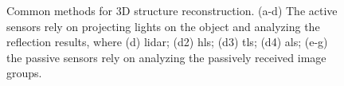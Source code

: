 \begin{figure}[htb!]
  \begin{center}
  \end{center}
  \caption[Common methods for 3D structure reconstruction]{
    Common methods for 3D structure reconstruction. (a-d) The active sensors rely on projecting lights on the object and analyzing the reflection results, where (d) \acrfull{lidar}; (d2) \acrfull{hls}; (d3) \acrfull{tls}; (d4) \acrfull{als}; (e-g) the passive sensors rely on analyzing the passively received image groups. 
  }
  \label{fig:int2}
\end{figure}